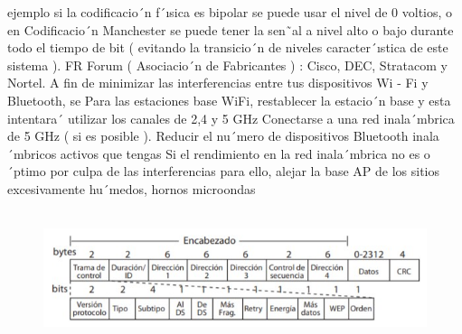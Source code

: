 \documentclass[conference,compsoc,onecolumn]{IEEEtran}
\begin{document}
ejemplo  si  la  codificacio´n  f´ısica  es  bipolar  se  puede  usar  el  nivel  de  0  voltios,  o  en  Codificacio´n  Manchester  se puede tener la sen˜al a nivel alto o bajo durante todo el tiempo de bit ( evitando la transicio´n de niveles caracter´ıstica de este sistema ). FR Forum ( Asociacio´n de Fabricantes ) : Cisco, DEC, Stratacom y Nortel.
A fin de minimizar las interferencias entre tus dispositivos Wi - Fi y Bluetooth, se Para las estaciones base WiFi, restablecer  la  estacio´n  base  y  esta  intentara´  utilizar  los  canales  de  2,4  y  5  GHz  Conectarse  a  una  red  inala´mbrica de  5  GHz  (  si  es  posible  ).  Reducir  el  nu´mero  de  dispositivos  Bluetooth  inala´mbricos  activos  que  tengas  Si  el rendimiento en la red inala´mbrica no es o´ptimo por culpa de las interferencias para ello, alejar la base AP de los sitios excesivamente hu´medos, hornos microondas\\
\\

\begin{figure}[H]
    \centering
    \includegraphics{bib/1.PNG}
    \label{fig:1}
\end{figure}
\end{document}
